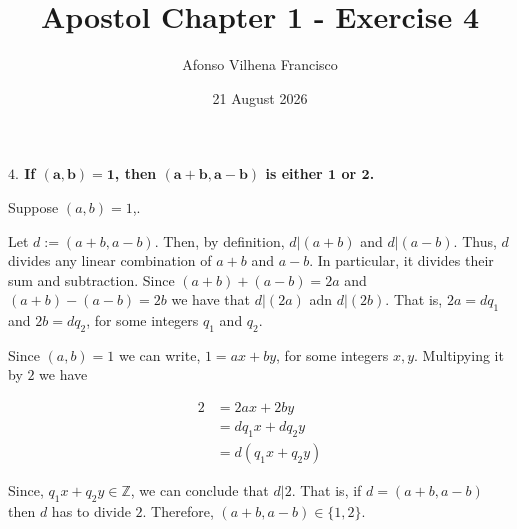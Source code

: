 \documentclass{article}
\title{Apostol Chapter 1 - Exercise 4}
\author{Afonso Vilhena Francisco}
\date{21 August 2026}
\begin{document}
\maketitle

\textbf{ $4.$ If $\mathbf{(a,b)=1}$, then $\mathbf{(a+b,a-b)}$ is either $\mathbf{1}$ or $\mathbf{2}$.}

\vspace{0.5cm}
Suppose $(a,b)=1$,.

Let $d:= (a+b,a-b)$. Then, by definition, $d|(a+b)$ and $d|(a-b)$. Thus, $d$ divides any linear combination of $a+b$ and $a-b$. In particular, it divides their sum and subtraction. Since $(a+b)+(a-b)=2a$ and $(a+b)-(a-b)=2b$ we have that $d|(2a)$ adn $d|(2b)$. That is, $2a=dq_1$ and $2b=dq_2$, for some integers $q_1$ and $q_2$.

\vspace{0.25cm}

Since $(a,b)=1$ we can write, $1=ax+by$, for some integers $x,y$. Multipying it by $2$ we have

\begin{align*}
    2 & = 2ax+2by\\
      & = dq_1x+dq_2y\\
      & = d(q_1x+q_2y)
\end{align*}

Since, $q_1x+q_2y \in \mathbb{Z}$, we can conclude that $d|2$. That is, if $d=(a+b,a-b)$ then $d$ has to divide $2$. Therefore, $(a+b,a-b) \in \{ 1,2 \}$.
\end{document}
